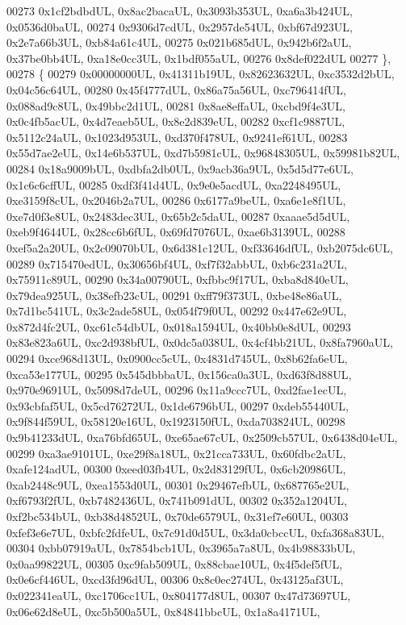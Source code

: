 \begin{DoxyCode}
00273     0x1cf2bdbdUL, 0x8ac2bacaUL, 0x3093b353UL, 0xa6a3b424UL, 0x0536d0baUL,
00274     0x9306d7cdUL, 0x2957de54UL, 0xbf67d923UL, 0x2e7a66b3UL, 0xb84a61c4UL,
00275     0x021b685dUL, 0x942b6f2aUL, 0x37be0bb4UL, 0xa18e0cc3UL, 0x1bdf055aUL,
00276     0x8def022dUL
00277   \},
00278   \{
00279     0x00000000UL, 0x41311b19UL, 0x82623632UL, 0xc3532d2bUL, 0x04c56c64UL,
00280     0x45f4777dUL, 0x86a75a56UL, 0xc796414fUL, 0x088ad9c8UL, 0x49bbc2d1UL,
00281     0x8ae8effaUL, 0xcbd9f4e3UL, 0x0c4fb5acUL, 0x4d7eaeb5UL, 0x8e2d839eUL,
00282     0xcf1c9887UL, 0x5112c24aUL, 0x1023d953UL, 0xd370f478UL, 0x9241ef61UL,
00283     0x55d7ae2eUL, 0x14e6b537UL, 0xd7b5981cUL, 0x96848305UL, 0x59981b82UL,
00284     0x18a9009bUL, 0xdbfa2db0UL, 0x9acb36a9UL, 0x5d5d77e6UL, 0x1c6c6cffUL,
00285     0xdf3f41d4UL, 0x9e0e5acdUL, 0xa2248495UL, 0xe3159f8cUL, 0x2046b2a7UL,
00286     0x6177a9beUL, 0xa6e1e8f1UL, 0xe7d0f3e8UL, 0x2483dec3UL, 0x65b2c5daUL,
00287     0xaaae5d5dUL, 0xeb9f4644UL, 0x28cc6b6fUL, 0x69fd7076UL, 0xae6b3139UL,
00288     0xef5a2a20UL, 0x2c09070bUL, 0x6d381c12UL, 0xf33646dfUL, 0xb2075dc6UL,
00289     0x715470edUL, 0x30656bf4UL, 0xf7f32abbUL, 0xb6c231a2UL, 0x75911c89UL,
00290     0x34a00790UL, 0xfbbc9f17UL, 0xba8d840eUL, 0x79dea925UL, 0x38efb23cUL,
00291     0xff79f373UL, 0xbe48e86aUL, 0x7d1bc541UL, 0x3c2ade58UL, 0x054f79f0UL,
00292     0x447e62e9UL, 0x872d4fc2UL, 0xc61c54dbUL, 0x018a1594UL, 0x40bb0e8dUL,
00293     0x83e823a6UL, 0xc2d938bfUL, 0x0dc5a038UL, 0x4cf4bb21UL, 0x8fa7960aUL,
00294     0xce968d13UL, 0x0900cc5cUL, 0x4831d745UL, 0x8b62fa6eUL, 0xca53e177UL,
00295     0x545dbbbaUL, 0x156ca0a3UL, 0xd63f8d88UL, 0x970e9691UL, 0x5098d7deUL,
00296     0x11a9ccc7UL, 0xd2fae1ecUL, 0x93cbfaf5UL, 0x5cd76272UL, 0x1de6796bUL,
00297     0xdeb55440UL, 0x9f844f59UL, 0x58120e16UL, 0x1923150fUL, 0xda703824UL,
00298     0x9b41233dUL, 0xa76bfd65UL, 0xe65ae67cUL, 0x2509cb57UL, 0x6438d04eUL,
00299     0xa3ae9101UL, 0xe29f8a18UL, 0x21cca733UL, 0x60fdbc2aUL, 0xafe124adUL,
00300     0xeed03fb4UL, 0x2d83129fUL, 0x6cb20986UL, 0xab2448c9UL, 0xea1553d0UL,
00301     0x29467efbUL, 0x687765e2UL, 0xf6793f2fUL, 0xb7482436UL, 0x741b091dUL,
00302     0x352a1204UL, 0xf2bc534bUL, 0xb38d4852UL, 0x70de6579UL, 0x31ef7e60UL,
00303     0xfef3e6e7UL, 0xbfc2fdfeUL, 0x7c91d0d5UL, 0x3da0cbccUL, 0xfa368a83UL,
00304     0xbb07919aUL, 0x7854bcb1UL, 0x3965a7a8UL, 0x4b98833bUL, 0x0aa99822UL,
00305     0xc9fab509UL, 0x88cbae10UL, 0x4f5def5fUL, 0x0e6cf446UL, 0xcd3fd96dUL,
00306     0x8c0ec274UL, 0x43125af3UL, 0x022341eaUL, 0xc1706cc1UL, 0x804177d8UL,
00307     0x47d73697UL, 0x06e62d8eUL, 0xc5b500a5UL, 0x84841bbcUL, 0x1a8a4171UL,

\end{DoxyCode}

